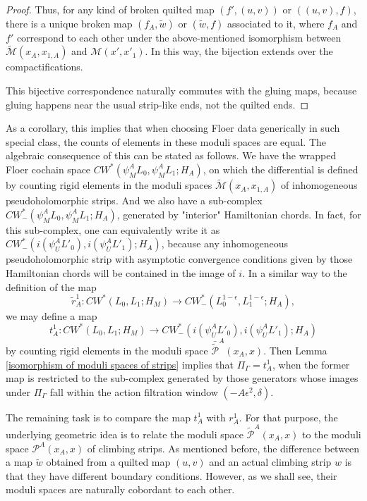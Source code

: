 \documentclass{amsart}
\numberwithin{equation}{section}
\numberwithin{figure}{section}
\begin{document}
\begin{proof}
Thus, for any kind of broken quilted map $(f', (u, v))$ or $((u, v), f)$, there is a unique broken map $(f_{A}, \tilde{w})$ or $(\tilde{w}, f)$ associated to it, where $f_{A}$ and $f'$ correspond to each other under the above-mentioned isomorphism between $\tilde{\mathcal{M}}(x_{A}, x_{1, A})$ and $\mathcal{M}(x', x'_{1})$. In this way, the bijection extends over the compactifications. \par
	This bijective correspondence naturally commutes with the gluing maps, because gluing happens near the usual strip-like ends, not the quilted ends. \par

\end{proof}

	As a corollary, this implies that when choosing Floer data generically in such special class, the counts of elements in these moduli spaces are equal. The algebraic consequence of this can be stated as follows. We have the wrapped Floer cochain space $CW^{*}(\psi_{M}^{A} L_{0}, \psi_{M}^{A} L_{1}; H_{A})$, on which the differential is defined by counting rigid elements in the moduli spaces $\tilde{\mathcal{M}}(x_{A}, x_{1, A})$ of inhomogeneous pseudoholomorphic strips. And we also have a sub-complex $CW^{*}_{-}(\psi_{M}^{A} L_{0}, \psi_{M}^{A} L_{1}; H_{A})$, generated by "interior" Hamiltonian chords. In fact, for this sub-complex, one can equivalently write it as $CW^{*}_{-}(i(\psi_{U}^{A} L'_{0}), i(\psi_{U}^{A} L'_{1}); H_{A})$, because any inhomogeneous pseudoholomorphic strip with asymptotic convergence conditions given by those Hamiltonian chords will be contained in the image of $i$.
In a similar way to the definition of the map
\begin{equation*}
\tilde{r}^{1}_{A}: CW^{*}(L_{0}, L_{1}; H_{M}) \to CW^{*}_{-}(L_{0}^{1-\epsilon}, L_{1}^{1-\epsilon}; H_{A}),
\end{equation*}
we may define a map
\begin{equation}
t^{1}_{A}: CW^{*}(L_{0}, L_{1}; H_{M}) \to CW^{*}_{-}(i(\psi_{U}^{A} L'_{0}), i(\psi_{U}^{A} L'_{1}); H_{A})
\end{equation}
by counting rigid elements in the moduli space $\bar{\tilde{\mathcal{P}}}^{A}(x_{A}, x)$. 
Then Lemma \ref{isomorphism of moduli spaces of strips} implies that $\Pi_{\Gamma} = t^{1}_{A}$, when the former map is restricted to the sub-complex generated by those generators whose images under $\Pi_{\Gamma}$ fall within the action filtration window $(-A\epsilon^{2}, \delta)$. \par
	The remaining task is to compare the map $t^{1}_{A}$ with $r^{1}_{A}$. For that purpose, the underlying geometric idea is to relate the moduli space $\tilde{\mathcal{P}}^{A}(x_{A}, x)$ to the moduli space $\mathcal{P}^{A}(x_{A}, x)$ of climbing strips. As mentioned before, the difference between a map $\tilde{w}$ obtained from a quilted map $(u, v)$ and an actual climbing strip $w$ is that they have different boundary conditions. However, as we shall see, their moduli spaces are naturally cobordant to each other. \par
\end{document}
